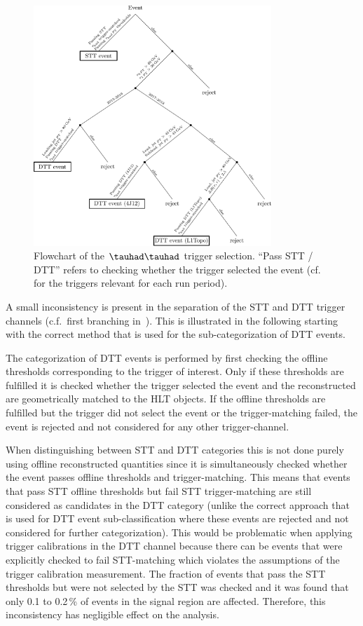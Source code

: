 \begin{figure}[htbp]
  \centering
  \includegraphics[width=0.8\textwidth]{figures/selection/HadHad_HH/trigger_flowchart_hadhad.pdf}
  \caption{Flowchart of the $\tauhad\tauhad$ trigger selection. ``Pass
    STT / DTT'' refers to checking whether the trigger selected the
    event (cf.~ for the triggers relevant
    for each run period).}
  \label{fig:hadhad_trigger_flowchart}
\end{figure}

A small inconsistency is present in the separation of the STT and DTT
trigger channels (c.f.\ first branching
in~). This is illustrated in the
following starting with the correct method that is used for the
sub-categorization of DTT events.

The categorization of DTT events is performed by first checking the
offline thresholds corresponding to the trigger of interest. Only if
these thresholds are fulfilled it is checked whether the trigger
selected the event and the reconstructed \tauhad are geometrically
matched to the HLT objects. If the offline thresholds are fulfilled
but the trigger did not select the event or the trigger-matching
failed, the event is rejected and not considered for any other
trigger-channel.

When distinguishing between STT and DTT categories this is not done
purely using offline reconstructed quantities since it is
simultaneously checked whether the event passes offline thresholds and
trigger-matching. This means that events that pass STT offline
thresholds but fail STT trigger-matching are still considered as
candidates in the DTT category (unlike the correct approach that is
used for DTT event sub-classification where these events are rejected
and not considered for further categorization). This would be
problematic when applying \tauhad trigger calibrations in the DTT
channel because there can be events that were explicitly checked to
fail STT-matching which violates the assumptions of the \tauhad
trigger calibration measurement. The fraction of events that pass the
STT thresholds but were not selected by the STT was checked and it was
found that only 0.1 to 0.2\,\% of events in the signal region are
affected. Therefore, this inconsistency has negligible effect on the
analysis.
